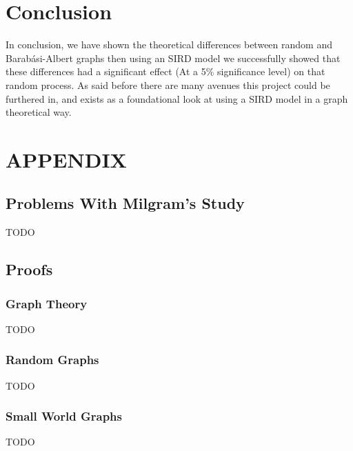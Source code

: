 \documentclass{article}
\begin{document}
    \section{Conclusion}
    In conclusion, we have shown the theoretical differences between random and Barabási-Albert graphs then using an SIRD model we successfully showed that these differences had a significant effect (At a 5\% significance level) on that random process. As said before there are many avenues this project could be furthered in, and exists as a foundational look at using a SIRD model in a graph theoretical way.

    \section{APPENDIX}
        \subsection{Problems With Milgram's Study}
        TODO
        \subsection{Proofs}
            \subsubsection{Graph Theory}
            TODO
            \subsubsection{Random Graphs}
            TODO
            \subsubsection{Small World Graphs}
            TODO
\end{document}
